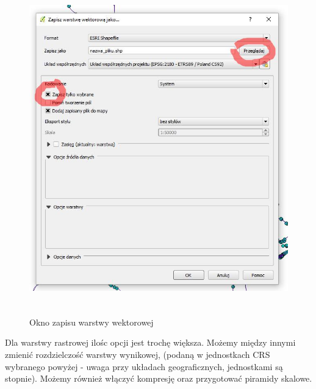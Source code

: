 \documentclass[12pt,a4paper]{book}
\begin{document}
\begin{figure}[ht]
	\centering
	\includegraphics[width=13cm,height=14.372cm]{002-zapisz-wektor.jpg}
	\caption{Okno zapisu warstwy wektorowej}
\end{figure}

Dla warstwy rastrowej ilośc opcji jest trochę większa. Możemy między innymi zmienić rozdzielczość warstwy wynikowej, (podaną w jednostkach CRS wybranego powyżej - uwaga przy układach geograficznych, jednostkami są stopnie). Możemy również włączyć kompresję oraz przygotować piramidy skalowe.
\end{document}
